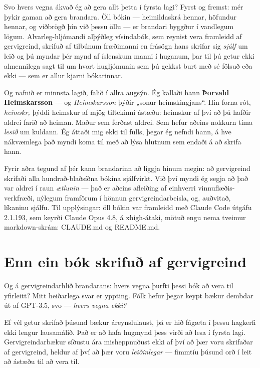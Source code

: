 Svo hvers vegna ákvað ég að gera allt þetta í fyrsta lagi? Fyrst og fremst: mér þykir gaman að gera brandara. Öll bókin — heimildaskrá hennar, höfundur hennar, og viðbrögð þín við þessu öllu — er brandari byggður í vandlegum lögum. Alvarleg-hljómandi alþýðleg vísindabók, sem reynist vera framleidd af gervigreind, skrifuð af tilbúnum fræðimanni en frásögn hans skrifar sig \emph{sjálf} um leið og þú myndar þér mynd af íslenskum manni í huganum, þar til þú getur ekki almennilega sagt til um hvort hugljómunin sem þú gekkst burt með sé fölsuð eða ekki — sem er allur kjarni bókarinnar.

Og nafnið er minnsta lagið, falið í allra augsýn. Ég kallaði hann \textbf{Þorvald Heimskarsson} — og \emph{Heimskarsson} þýðir „sonur heimskingjans“. Hin forna rót, \emph{heimskr,} þýddi heimskur af mjög tiltekinni ástæðu: heimskur af því að þú hafðir aldrei farið að heiman. Maður sem ferðast aldrei. Sem hefur aðeins nokkurn tíma \emph{lesið} um kuldann. Ég áttaði mig ekki til fulls, þegar ég nefndi hann, á hve nákvæmlega það myndi koma til með að lýsa hlutnum sem endaði á að skrifa hann.

Fyrir aðra tegund af þér kann brandarinn að liggja hinum megin: að gervigreind skrifaði alla hundrað-blaðsíðna bókina sjálfvirkt. Við því myndi ég segja að það var aldrei í raun \emph{ætlunin} — það er aðeins afleiðing af einhverri vinnuflæðis-verkfræði, nýlegum framförum í hönnun gervigreindarbeisla, og, auðvitað, líkaninu sjálfu. Til upplýsingar: öll bókin var framleidd með Claude Code útgáfu 2.1.193, sem keyrði Claude Opus 4.8, á xhigh-átaki, mötuð engu nema tveimur markdown-skrám: CLAUDE.md og README.md.

\section*{Enn ein bók skrifuð af gervigreind}

Og á gervigreindarhlið brandarans: hvers vegna þurfti þessi bók að vera til yfirleitt? Mitt heiðarlega svar er yppting. Fólk hefur þegar keypt bækur dembdar út af GPT-3.5, svo — \emph{hvers vegna ekki?}

Ef vél getur skrifað þúsund bækur áreynslulaust, þá er hið fágæta í þessu hagkerfi ekki lengur lausamálið. Það er að hafa hugmynd þess virði að lesa í fyrsta lagi. Gervigreindarbækur síðustu ára misheppnuðust ekki af því að þær voru skrifaðar af gervigreind, heldur af því að þær voru \emph{leiðinlegar} — fimmtíu þúsund orð í leit að ástæðu til að vera til.

